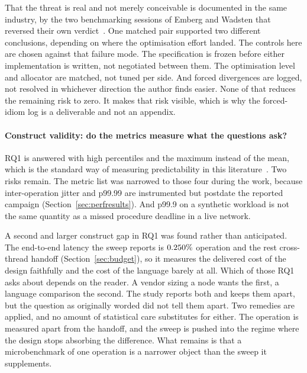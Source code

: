 \documentclass[english,oneside,a4paper,censored,csm,software-track-2020]{HYthesisML}
\begin{document}
That the threat is real and not merely conceivable is documented in the same industry, by the two
benchmarking sessions of Emberg and Wadsten that reversed their own
verdict~\cite{emberg2023asn1}. One matched pair supported two different conclusions, depending on
where the optimisation effort landed. The controls here are chosen against that failure
mode. The specification is frozen before either implementation is written, not negotiated
between them. The optimisation level and allocator are matched, not tuned per side. And
forced divergences are logged, not resolved in whichever direction the author finds easier.
None of that reduces the remaining risk to zero. It makes that risk visible, which is why the
forced-idiom log is a deliverable and not an appendix.

\paragraph{Construct validity: do the metrics measure what the questions ask?}
RQ1 is answered with high percentiles and the maximum instead of the mean, which is the standard
way of measuring predictability in this literature~\cite{dean2013tail}. Two risks remain. The
metric list was narrowed to those four during the work, because inter-operation jitter and p99.99
are instrumented but postdate the reported campaign (Section~\ref{sec:perfresults}). And p99.9 on
a synthetic workload is not the same quantity as a missed procedure deadline in a live network.

A second and larger construct gap in RQ1 was found rather than anticipated. The end-to-end latency
the sweep reports is $0.250\%$ operation and the rest cross-thread handoff
(Section~\ref{sec:budget}), so it measures the delivered cost of the design faithfully and the
cost of the language barely at all. Which of those RQ1 asks about depends on the reader. A vendor
sizing a node wants the first, a language comparison the second. The study reports both and keeps
them apart, but the question as originally worded did not tell them apart. Two remedies are
applied, and no amount of statistical care substitutes for either. The operation is measured apart
from the handoff, and the sweep is pushed into the regime where the design stops absorbing the
difference. What remains is that a microbenchmark of one operation is a narrower object than the
sweep it supplements.
\end{document}
